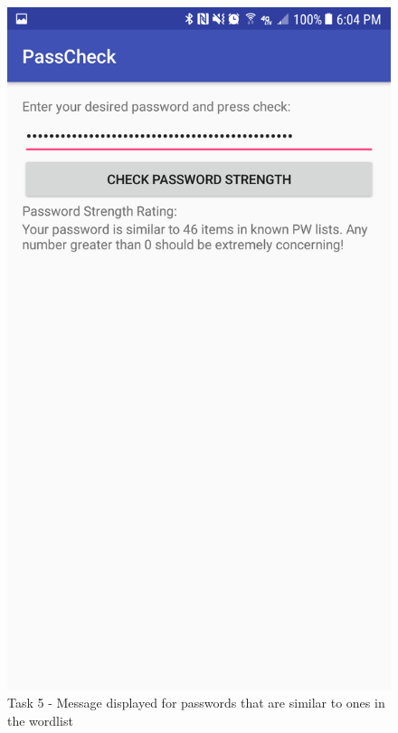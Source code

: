 \documentclass{article}
\makeatletter
\def\maxwidth#1{\ifdim\Gin@nat@width>#1 #1\else\Gin@nat@width\fi}
\makeatother
\begin{document}
	\begin{figure}[ht]
		\includegraphics[width=\maxwidth{3in}]{img/t5s3.png}
		\centering
        \caption{Task 5 - Message displayed for passwords that are similar to ones in the wordlist}
	\end{figure}
\end{document}
